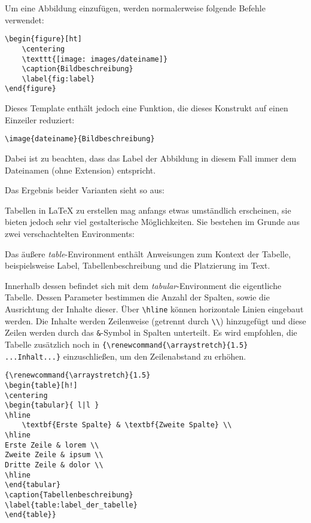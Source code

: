 
Um eine Abbildung einzufügen, werden normalerweise folgende Befehle verwendet:

\begin{verbatim}
\begin{figure}[ht]
    \centering
    \texttt{[image: images/dateiname]}
    \caption{Bildbeschreibung}
    \label{fig:label}
\end{figure}
\end{verbatim}

Dieses Template enthält jedoch eine Funktion, die dieses Konstrukt auf einen Einzeiler reduziert:

\begin{verbatim}
\image{dateiname}{Bildbeschreibung}
\end{verbatim}

Dabei ist zu beachten, dass das Label der Abbildung in diesem Fall immer dem Dateinamen (ohne Extension) entspricht.

Das Ergebnis beider Varianten sieht so aus:



Tabellen in \LaTeX{} zu erstellen mag anfangs etwas umständlich erscheinen, sie bieten jedoch sehr viel gestalterische Möglichkeiten.
Sie bestehen im Grunde aus zwei verschachtelten Environments:

Das äußere \textit{table}-Environment enthält Anweisungen zum Kontext der Tabelle, beispielsweise Label, Tabellenbeschreibung und die Platzierung im Text.

Innerhalb dessen befindet sich mit dem \textit{tabular}-Environment die eigentliche Tabelle.
Dessen Parameter bestimmen die Anzahl der Spalten, sowie die Ausrichtung der Inhalte dieser.
Über \verb|\hline| können horizontale Linien eingebaut werden.
Die Inhalte werden Zeilenweise (getrennt durch \verb|\\|) hinzugefügt und diese Zeilen werden durch das \verb|&|-Symbol in Spalten unterteilt.
Es wird empfohlen, die Tabelle zusätzlich noch in \verb|{\renewcommand{\arraystretch}{1.5} ...Inhalt...}| einzuschließen, um den Zeilenabstand zu erhöhen.

\begin{verbatim}
{\renewcommand{\arraystretch}{1.5}
\begin{table}[h!]
\centering
\begin{tabular}{ l|l } 
\hline
    \textbf{Erste Spalte} & \textbf{Zweite Spalte} \\
\hline
Erste Zeile & lorem \\
Zweite Zeile & ipsum \\
Dritte Zeile & dolor \\
\hline
\end{tabular}
\caption{Tabellenbeschreibung}
\label{table:label_der_tabelle}
\end{table}}
\end{verbatim}


